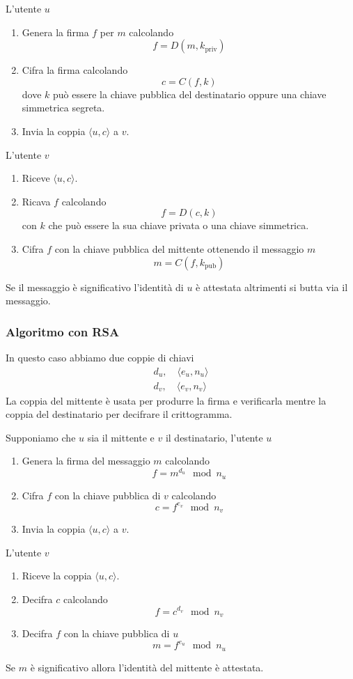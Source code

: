 L'utente $u$
\begin{enumerate}
	\item Genera la firma $f$ per $m$ calcolando
	      \[ f = D(m, k_\text{priv}) \]
	\item Cifra la firma calcolando
	      \[ c = C(f, k) \]
	      dove $k$ pu\`o essere la chiave pubblica del destinatario oppure una chiave simmetrica segreta.
	\item Invia la coppia $\langle u, c \rangle$ a $v$.
\end{enumerate}
L'utente $v$
\begin{enumerate}
	\item Riceve $\langle u, c \rangle$.
	\item Ricava $f$ calcolando
	      \[ f = D(c, k) \]
	      con $k$ che pu\`o essere la sua chiave privata o una chiave simmetrica.
	\item Cifra $f$ con la chiave pubblica del mittente ottenendo il messaggio $m$
	      \[ m = C(f, k_\text{pub}) \]
\end{enumerate}
Se il messaggio \`e significativo l'identit\`a di $u$ \`e attestata altrimenti si butta via il messaggio.

\subsubsection{Algoritmo con RSA}
In questo caso abbiamo due coppie di chiavi
\begin{gather*}
	d_u, \quad \langle e_u, n_u \rangle \\
	d_v, \quad \langle e_v, n_v \rangle
\end{gather*}
La coppia del mittente \`e usata per produrre la firma e verificarla mentre la coppia del destinatario per decifrare
il crittogramma.

Supponiamo che $u$ sia il mittente e $v$ il destinatario, l'utente $u$
\begin{enumerate}
	\item Genera la firma del messaggio $m$ calcolando
	      \[ f = m^{d_u} \mod{n_u} \]
	\item Cifra $f$ con la chiave pubblica di $v$ calcolando
	      \[ c = f^{e_v} \mod{n_v} \]
	\item Invia la coppia $\langle u, c \rangle$ a $v$.
\end{enumerate}
L'utente $v$
\begin{enumerate}
	\item Riceve la coppia $\langle u, c \rangle$.
	\item Decifra $c$ calcolando
	      \[ f = c^{d_v} \mod{n_v} \]
	\item Decifra $f$ con la chiave pubblica di $u$
	      \[ m = f^{e_u} \mod{n_u} \]
\end{enumerate}
Se $m$ \`e significativo allora l'identit\`a del mittente \`e attestata.

